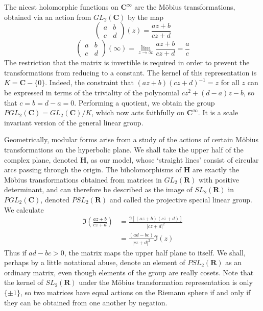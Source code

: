 The nicest holomorphic functions on $\mathbf{C}^\infty$ are the M\"{o}bius transformations, obtained via an action from $GL_2(\mathbf{C})$ by the map
%
\[ \begin{pmatrix} a & b \\ c & d \end{pmatrix}(z)  = \frac{az + b}{cz + d} \]
%
\[ \begin{pmatrix} a & b \\ c & d \end{pmatrix}(\infty) = \lim_{z \to \infty } \frac{az + b}{cz + d} = \frac{a}{c} \]
%
The restriction that the matrix is invertible is required in order to prevent the transformations from reducing to a constant. The kernel of this representation is $K = \mathbf{C} - \{ 0 \}$. Indeed, the constraint that $(az + b)(cz + d)^{-1} = z$ for all $z$ can be expressed in terms of the triviality of the polynomial $cz^2 + (d-a)z - b$, so that $c = b = d-a = 0$. Performing a quotient, we obtain the group $PGL_2(\mathbf{C}) = GL_2(\mathbf{C})/K$, which now acts faithfully on $\mathbf{C}^\infty$. It is a scale invariant version of the general linear group.

Geometrically, modular forms arise from a study of the actions of certain M\"{o}bius transformations on the hyperbolic plane. We shall take the upper half of the complex plane, denoted $\mathbf{H}$, as our model, whose `straight lines' consist of circular arcs passing through the origin. The biholomorphisms of $\mathbf{H}$ are exactly the M\"{o}bius transformations obtained from matrices in $GL_2(\mathbf{R})$ with positive determinant, and can therefore be described as the image of $SL_2(\mathbf{R})$ in $PGL_2(\mathbf{C})$, denoted $PSL_2(\mathbf{R})$ and called the projective special linear group. We calculate
%
\begin{align*}
    \Im \left( \frac{az + b}{cz + d} \right) &= \frac{\Im[(az + b)(c\overline{z} + d)]}{|cz + d|^2}\\
    &= \frac{(ad - bc)}{|cz + d|^2} \Im(z)
\end{align*}
%
Thus if $ad - bc > 0$, the matrix maps the upper half plane to itself. We shall, perhaps by a little notational abuse, denote an element of $PSL_2(\mathbf{R})$ as an ordinary matrix, even though elements of the group are really cosets. Note that the kernel of $SL_2(\mathbf{R})$ under the M\"{o}bius transformation representation is only $\{ \pm 1 \}$, so two matrices have equal actions on the Riemann sphere if and only if they can be obtained from one another by negation.

